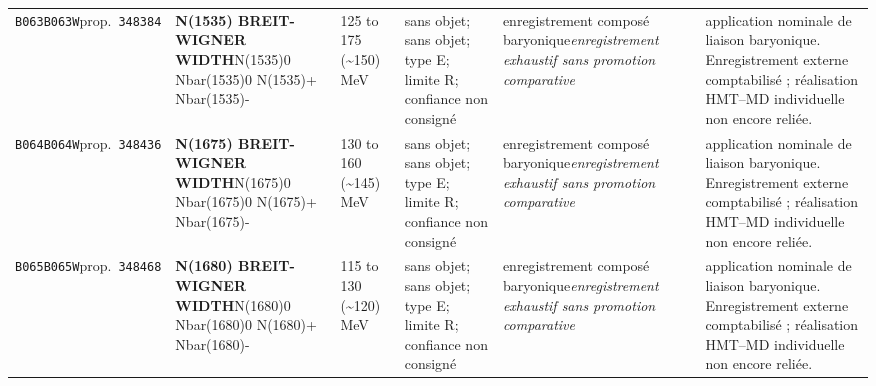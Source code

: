 \begin{landscape}
\begin{longtable}{L{1.85cm}L{4.45cm}L{2.35cm}L{4.05cm}L{3.35cm}L{7.15cm}}
\texttt{B063}\newline \texttt{B063W}\newline prop.\ \texttt{348384} & \textbf{N(1535) BREIT-WIGNER WIDTH}\newline N(1535)0 \textbar{}\allowbreak{} Nbar(1535)0 \textbar{}\allowbreak{} N(1535)+ \textbar{}\allowbreak{} Nbar(1535)- & 125 to 175 (\textasciitilde{}150)\,MeV & sans objet; sans objet; type E; limite R; confiance non consigné & enregistrement composé baryonique\newline \emph{enregistrement exhaustif sans promotion comparative} & application nominale de liaison baryonique. Enregistrement externe comptabilisé ; réalisation HMT--MD individuelle non encore reliée. \\
\texttt{B064}\newline \texttt{B064W}\newline prop.\ \texttt{348436} & \textbf{N(1675) BREIT-WIGNER WIDTH}\newline N(1675)0 \textbar{}\allowbreak{} Nbar(1675)0 \textbar{}\allowbreak{} N(1675)+ \textbar{}\allowbreak{} Nbar(1675)- & 130 to 160 (\textasciitilde{}145)\,MeV & sans objet; sans objet; type E; limite R; confiance non consigné & enregistrement composé baryonique\newline \emph{enregistrement exhaustif sans promotion comparative} & application nominale de liaison baryonique. Enregistrement externe comptabilisé ; réalisation HMT--MD individuelle non encore reliée. \\
\texttt{B065}\newline \texttt{B065W}\newline prop.\ \texttt{348468} & \textbf{N(1680) BREIT-WIGNER WIDTH}\newline N(1680)0 \textbar{}\allowbreak{} Nbar(1680)0 \textbar{}\allowbreak{} N(1680)+ \textbar{}\allowbreak{} Nbar(1680)- & 115 to 130 (\textasciitilde{}120)\,MeV & sans objet; sans objet; type E; limite R; confiance non consigné & enregistrement composé baryonique\newline \emph{enregistrement exhaustif sans promotion comparative} & application nominale de liaison baryonique. Enregistrement externe comptabilisé ; réalisation HMT--MD individuelle non encore reliée. \\

\end{longtable}
\end{landscape}
